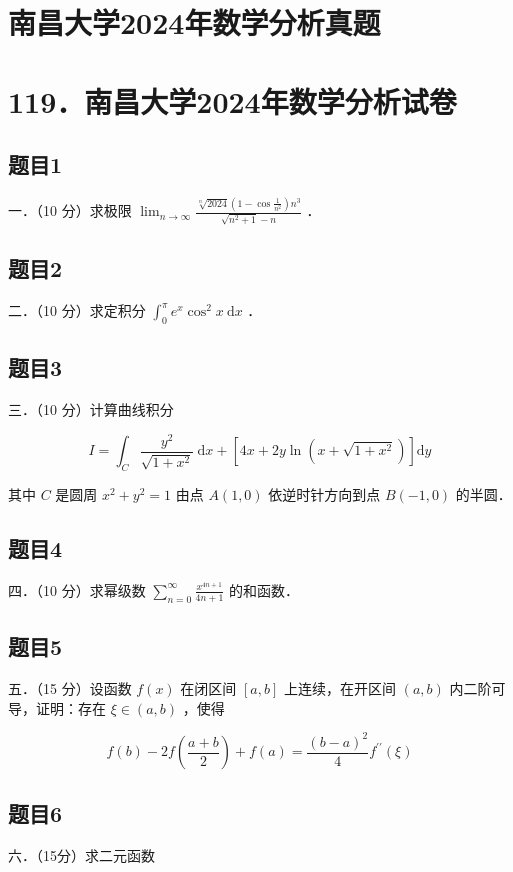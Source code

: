 \documentclass{article}
\begin{document}
\section*{南昌大学2024年数学分析真题}
\section*{119．南昌大学2024年数学分析试卷}

\subsection{题目1}
一．（10 分）求极限 \(\lim _{n \rightarrow \infty} \frac{\sqrt[n]{2024}\left(1-\cos \frac{1}{n^{2}}\right) n^{3}}{\sqrt{n^{2}+1}-n}\) ．

\subsection{题目2}
二．（10 分）求定积分 \(\int_{0}^{\pi} e^{x} \cos ^{2} x \mathrm{~d} x\) ．

\subsection{题目3}
三．（10 分）计算曲线积分

\[
I=\int_{C} \frac{y^{2}}{\sqrt{1+x^{2}}} \mathrm{~d} x+\left[4 x+2 y \ln \left(x+\sqrt{1+x^{2}}\right)\right] \mathrm{d} y
\]

其中 \(C\) 是圆周 \(x^{2}+y^{2}=1\) 由点 \(A(1,0)\) 依逆时针方向到点 \(B(-1,0)\) 的半圆．

\subsection{题目4}
四．（10 分）求幂级数 \(\sum_{n=0}^{\infty} \frac{x^{4 n+1}}{4 n+1}\) 的和函数．

\subsection{题目5}
五．（15 分）设函数 \(f(x)\) 在闭区间 \([a, b]\) 上连续，在开区间 \((a, b)\) 内二阶可导，证明：存在 \(\xi \in(a, b)\) ，使得

\[
f(b)-2 f\left(\frac{a+b}{2}\right)+f(a)=\frac{(b-a)^{2}}{4} f^{\prime \prime}(\xi)
\]

\subsection{题目6}
六．（15分）求二元函数
\end{document}
